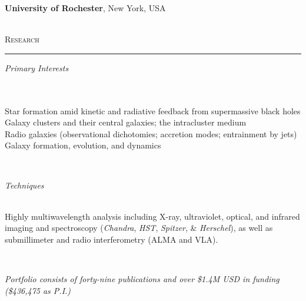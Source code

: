\documentclass[11pt]{article}
\makeatletter
\def\vhrulefill#1{\leavevmode\leaders\hrule\@height#1\hfill \kern\z@}
\makeatother
\begin{document}
\hspace{42mm} \parbox{5.15in}{\textbf{University of Rochester}, New York, USA} \\



\textsc{Research}  \vhrulefill{0.4pt}

\vspace{4mm}

\hspace{2.5mm} \parbox{1.5in}{\textit{Primary Interests \\\\\\}} \parbox{5.15in}{Star formation amid kinetic and radiative feedback from supermassive black holes \\ Galaxy clusters and their central galaxies; the intracluster medium \\ Radio galaxies (observational dichotomies; accretion modes; entrainment by jets) \\ Galaxy formation, evolution, and dynamics  } \\


\vspace{4mm}

\hspace{2.5mm} \parbox{1.5in}{\textit{Techniques \\\\}} \parbox{5.15in}{Highly multiwavelength analysis including X-ray, ultraviolet, optical, and infrared imaging and spectroscopy (\textit{Chandra}, \textit{HST}, \textit{Spitzer}, \& \textit{Herschel}), as well as submillimeter and radio interferometry (ALMA and VLA).  } \\

\vspace*{-3mm}

\begin{center}
\textit{Portfolio consists of forty-nine publications and over \$1.4M USD in funding (\$436,475 as P.I.)}  \\
\end{center}


\clearpage
\end{document}
